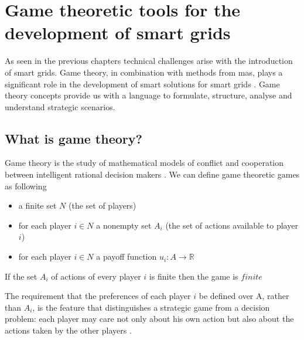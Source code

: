 \section{Game theoretic tools for the development of smart grids}

As seen in the previous chapters technical challenges arise with the introduction of smart grids. Game theory, in combination with methods from \ac{mas}, plays a significant role in the development of smart solutions for smart grids \cite{keypaper}. Game theory concepts provide us with a language to formulate, structure, analyse and understand strategic scenarios.

\subsection{What is game theory?}
Game theory is the study of mathematical models of conflict and cooperation between intelligent rational decision makers \cite{myerson2013game}.
We can define game theoretic games as following
\begin{itemize}
    \item a finite set $N$ (the set of players)
    \item for each player $i \in N$ a nonempty set $A_i$ (the set of actions available to player $i$)
    \item for each player $i \in N$ a payoff function $u_i: A \rightarrow \mathbb{R}$ 
\end{itemize}

If the set $A_i$ of actions of every player $i$ is finite then the game is $finite$

The requirement that the preferences of each player $i$ be defined over A, rather than $A_{i}$, is the feature that distinguishes a strategic game from a decision problem: each  player may care not only about his own action but also about the actions taken by the other players  \cite{CourseInGameTheory}.

